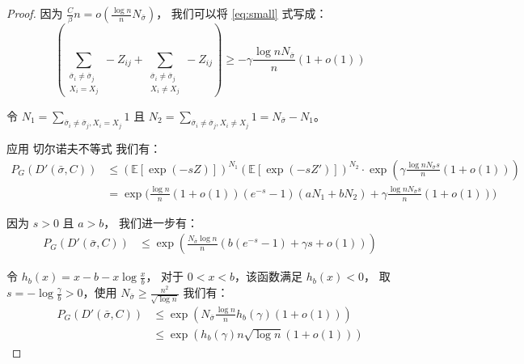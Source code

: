 \begin{proof}
	因为 $\frac{C}{\beta} n = o(\frac{\log n}{n} N_{\bar{\sigma}})$，
  我们可以将  \eqref{eq:small} 式写成：
\begin{equation}
	\left( \sum_{\substack{\bar{\sigma}_i  \neq \bar{\sigma}_j \\ X_i = X_j}} -Z_{ij}
	+ \sum_{\substack{\bar{\sigma}_i  \neq \bar{\sigma}_j \\ X_i \neq X_j}} -Z_{ij} \right)\geq -\gamma\frac{\log n N_{\bar{\sigma}}}{n}(1+o(1))
	\end{equation}
	
	令 $N_1 = \sum_{\bar{\sigma}_i  \neq \bar{\sigma}_j, X_i = X_j} 1$
	且 $N_2 = \sum_{\bar{\sigma}_i  \neq \bar{\sigma}_j, X_i \neq X_j} 1 = N_{\bar{\sigma}} - N_1$。
	
	应用 切尔诺夫不等式 我们有：
	\begin{align*}
	P_G(D'(\bar{\sigma}, C))&
	\leq (\mathbb{E}[\exp(-s Z )])^{N_1} (\mathbb{E}[\exp(-s Z' )])^{N_2} \cdot \exp(\gamma \frac{\log n N_{\bar{\sigma}} s}{n}(1+o(1))) \\
	&= \exp \Big( \frac{\log n}{n}(1+o(1))(e^{-s}-1)(aN_1 + bN_2) 
	+\gamma \frac{\log n N_{\bar{\sigma}} s}{n}(1+o(1))\Big)
	\end{align*}
	
	因为 $s > 0$ 且 $a>b$，
  我们进一步有：
	\begin{align*}
	P_G(D'(\bar{\sigma}, C))
	& \leq \exp( \frac{N_{\bar{\sigma}}\log n }{n}(b(e^{-s}-1)+ \gamma s + o(1))) 
	\end{align*}
	
	令 $h_b(x) = x - b -x\log \frac{x}{b}$，
  对于 $0<x<b$，该函数满足  $h_b(x) < 0$，
	取 $s=-\log\frac{\gamma}{b} > 0$，使用
	$N_{\bar{\sigma}} \geq \frac{n^2}{\sqrt{\log n}}$ 我们有：
	\begin{align*}
	P_G(D'(\bar{\sigma}, C))&\leq \exp( N_{\bar{\sigma}} \frac{\log n}{n} h_b(\gamma)(1+o(1))) \\
	& \leq \exp (h_b(\gamma) n \sqrt{\log n} (1+o(1)))
	\end{align*}
\end{proof}

